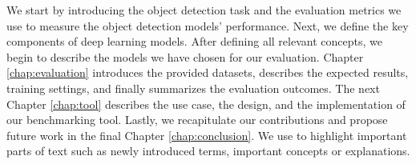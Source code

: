 We start by introducing the object detection task and the evaluation metrics we
use to measure the object detection models' performance. Next, we define the key
components of deep learning models. After defining all relevant concepts, we
begin to describe the models we have chosen for our evaluation. Chapter
\ref{chap:evaluation} introduces the provided datasets, describes the expected
results, training settings, and finally summarizes the evaluation outcomes. The
next Chapter \ref{chap:tool} describes the use case, the design, and the
implementation of our benchmarking tool. Lastly, we recapitulate our
contributions and propose future work in the final Chapter
\ref{chap:conclusion}. We use  to highlight important parts of
text such as newly introduced terms, important concepts or explanations.

